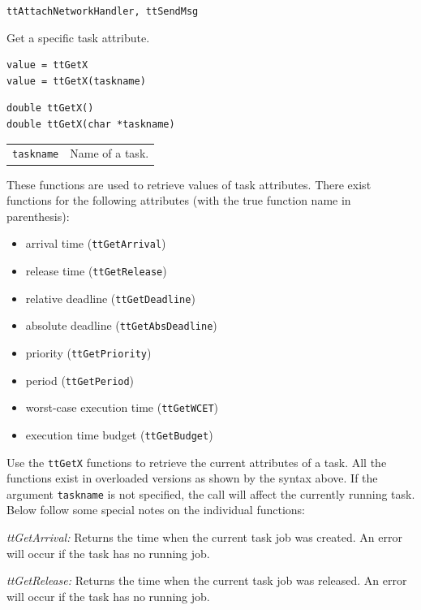 \documentclass[final,twoside]{rapport}
\begin{document}
\enlargethispage{\baselineskip}
\seealso
\texttt{ttAttachNetworkHandler, ttSendMsg}



\purpose
Get a specific task attribute.

\Msyntax
\begin{verbatim}
value = ttGetX
value = ttGetX(taskname)
\end{verbatim}

\Csyntax
\begin{verbatim}
double ttGetX()
double ttGetX(char *taskname)
\end{verbatim}

\args
\begin{tabularx}{\hsize}{l>{\raggedright\arraybackslash}X}
  {\tt taskname} & Name of a task. 
\end{tabularx}

\descr These functions are used to retrieve values of task attributes. There
exist functions for the following attributes (with the true function name
in parenthesis):
\begin{itemize}
  \item arrival time (\texttt{ttGetArrival})
  \item release time (\texttt{ttGetRelease})
  \item relative deadline (\texttt{ttGetDeadline})
  \item absolute deadline (\texttt{ttGetAbsDeadline})
  \item priority (\texttt{ttGetPriority})
  \item period (\texttt{ttGetPeriod})
  \item worst-case execution time (\texttt{ttGetWCET})
  \item execution time budget (\texttt{ttGetBudget})
\end{itemize}

Use the \texttt{ttGetX} functions to retrieve the current attributes
of a task. All the functions exist in overloaded versions as shown by
the syntax above. If the argument \texttt{taskname} is not specified,
the call will affect the currently running task. Below follow some
special notes on the individual functions:

{\it ttGetArrival:} Returns the time when the current task job
was created. An error will occur if the task has no running job.

{\it ttGetRelease:} Returns the time when the current task job
was released. An error will occur if the task has no running job.
\end{document}

